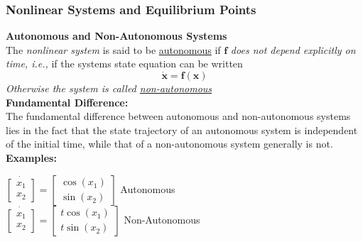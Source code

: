 \documentclass[11pt,handout]{beamer}   %
\begin{document}
\begin{frame}
\frametitle{Nonlinear Systems and Equilibrium Points}
\small
\textbf{Autonomous and Non-Autonomous Systems}\\
The \textit{nonlinear system} is said to be \underline{autonomous} if $\mathbf{f}$ \textit{does not depend explicitly on time, i.e.,} if the systems state equation can be written
\begin{equation*}
\dot{\mathbf{x}} = \mathbf{f(\mathbf{x})}
\end{equation*}
\textit{Otherwise the system is called \underline{non-autonomous}}\\
\vspace{6pt}
\textbf{Fundamental Difference:}\\
The fundamental difference between autonomous and non-autonomous systems lies in the fact that the state trajectory of an autonomous system is independent of the initial time, while that of a non-autonomous system generally is not.\\
\vspace{6pt}
\textbf{Examples:}\\
\begin{center}
$\dot{\begin{bmatrix}
x_1 \\ x_2
\end{bmatrix}} = \begin{bmatrix}
\cos(x_1) \\ \sin(x_2)
\end{bmatrix}$ Autonomous\\
\vspace{6pt}
$\dot{\begin{bmatrix}
x_1 \\ x_2
\end{bmatrix}} = \begin{bmatrix}
t \cos(x_1) \\ t \sin(x_2)
\end{bmatrix}$ Non-Autonomous\\
\end{center}
\end{frame}
\end{document}
